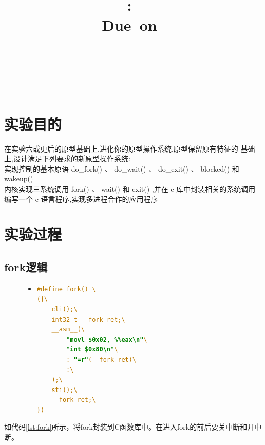 \documentclass[a4paper]{article}
\title{
\vspace{2in}
\textmd{\textbf{\hmwkClass:\ \hmwkTitle}}\\
\normalsize\vspace{0.1in}\small{Due\ on\ \hmwkDueDate}\\
\vspace{0.1in}\large{\textit{\hmwkClassInstructor\ \hmwkClassTime}}
\vspace{3in}
}
\author{\textbf{\LARGE{\hmwkAuthorName}} \\ \\ \textbf{\LARGE{\hmwkAuthorId}}}
\date{} %
\begin{document}

\maketitle




\renewcommand{\contentsname}{Content} %
\newpage
\tableofcontents
{}
\newpage



\section{实验目的}
在实验六或更后的原型基础上,进化你的原型操作系统,原型保留原有特征的
基础上,设计满足下列要求的新原型操作系统:\\ 

实现控制的基本原语 do\_fork() 、 do\_wait() 、 do\_exit() 、 blocked() 和 wakeup()\\ 

内核实现三系统调用 fork() 、 wait() 和 exit() ,并在 c 库中封装相关的系统调用\\ 

编写一个 c 语言程序,实现多进程合作的应用程序\\ 
\section{实验过程}
    \subsection{fork逻辑}
    \begin{figure}[!hbt]
    \begin{itemize}
    \item[] \begin{lstlisting}[language=C, label=lst:fork, caption=C库中封装的fork]
#define fork() \
({\
    cli();\
    int32_t __fork_ret;\
    __asm__(\
        "movl $0x02, %%eax\n"\
        "int $0x80\n"\
        : "=r"(__fork_ret)\
        :\
    );\
    sti();\
    __fork_ret;\
})
    \end{lstlisting}
    \end{itemize}
    \end{figure}
    如代码\ref{lst:fork}所示，将fork封装到C函数库中。在进入fork的前后要关中断和开中断。\\ 
\end{document}

